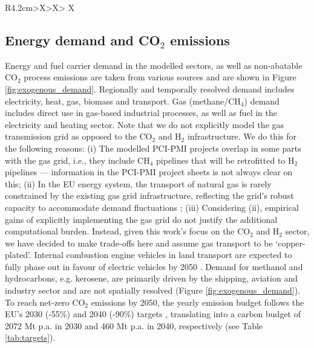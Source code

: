 \documentclass[pdflatex,sn-nature]{sn-jnl}
\theoremstyle{thmstyleone}%
\theoremstyle{thmstyletwo}%
\theoremstyle{thmstylethree}%
\begin{document}
\begin{appendices}
\begin{table}[htbp]
\begin{tabularx}{\linewidth}{R{4.2cm}>{\centering\arraybackslash}X>{\centering\arraybackslash}X>
  {\centering\arraybackslash}X}
    \bottomrule
  \end{tabularx}
\end{table}

\subsection*{Energy demand and CO$_2$ emissions}
Energy and fuel carrier demand in the modelled sectors, as well as non-abatable CO$_2$ process emissions are taken from various sources \cite{mantzosJRCIDEES20152018,eurostatCompleteEnergyBalances2022,manzGeoreferencedIndustrialSites2018,muehlenpfordtTimeSeries2019,krienOemofDemandlibV0222025} and are shown in Figure \ref{fig:exogenous_demand}. Regionally and temporally resolved demand includes electricity, heat, gas, biomass and transport. 
Gas (methane/CH$_4$) demand includes direct use in gas-based industrial processes, as well as fuel in the electricity and heating sector. Note that we do not explicitly model the gas transmission grid as opposed to the CO$_2$ and H$_2$ infrastructure. We do this for the following reasons: (i) The modelled PCI-PMI projects overlap in some parts with the gas grid, i.e., they include CH$_4$ pipelines that will be retrofitted to H$_2$ pipelines --- information in the PCI-PMI project sheets is not always clear on this; (ii) In the EU energy system, the transport of natural gas is rarely constrained by the existing gas grid infrastructure, reflecting the grid's robust capacity to accommodate demand fluctuations \cite{riepinModellingUncertaintyCoupled2021}; (iii) Considering (ii), empirical gains of explicitly implementing the gas grid do not justify the additional computational burden. 
Instead, given this work's focus on the CO$_2$ and H$_2$ sector, we have decided to make trade-offs here and assume gas transport to be `copper-plated'.
Internal combustion engine vehicles in land transport are expected to fully phase out in favour of electric vehicles by 2050 \cite{zeyenShiftingBurdensHow2025a}. Demand for methanol and hydrocarbons, e.g. kerosene, are primarily driven by the shipping, aviation and industry sector and are not spatially resolved (Figure \ref{fig:exogenous_demand}).
To reach net-zero CO$_2$ emissions by 2050, the yearly emission budget follows the EU's 2030 (-55\%) and 2040 (-90\%) targets \cite{europeancommissionFit55Delivering2021, europeancommission.directorategeneralforclimateaction.IndepthReportResults2024}, translating into a carbon budget of 2072 Mt p.a. in 2030 and 460 Mt p.a. in 2040, respectively (see Table \ref{tab:targets}).


\end{appendices}
\end{document}
